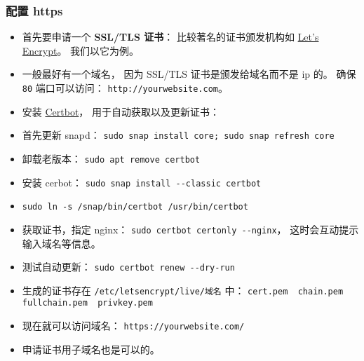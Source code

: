 \subsubsection{配置 https}
\begin{itemize}
\item 首先要申请一个 \textbf{SSL/TLS 证书}： 比较著名的证书颁发机构如 \href{https://letsencrypt.org/}{Let's Encrypt}。 我们以它为例。
\item 一般最好有一个域名， 因为 SSL/TLS 证书是颁发给域名而不是 ip 的。 确保 \verb|80| 端口可以访问： \verb|http://yourwebsite.com|。
\item 安装 \href{https://certbot.eff.org/instructions?ws=nginx&os=ubuntufocal}{Certbot}， 用于自动获取以及更新证书：
\item 首先更新 snapd： \verb|sudo snap install core; sudo snap refresh core|
\item 卸载老版本： \verb|sudo apt remove certbot|
\item 安装 cerbot： \verb|sudo snap install --classic certbot|
\item \verb|sudo ln -s /snap/bin/certbot /usr/bin/certbot|
\item 获取证书，指定 nginx： \verb|sudo certbot certonly --nginx|， 这时会互动提示输入域名等信息。
\item 测试自动更新： \verb|sudo certbot renew --dry-run|
\item 生成的证书存在 \verb|/etc/letsencrypt/live/域名| 中： \verb|cert.pem  chain.pem  fullchain.pem  privkey.pem|
\item 现在就可以访问域名： \verb|https://yourwebsite.com/|
\item 申请证书用子域名也是可以的。
\end{itemize}

